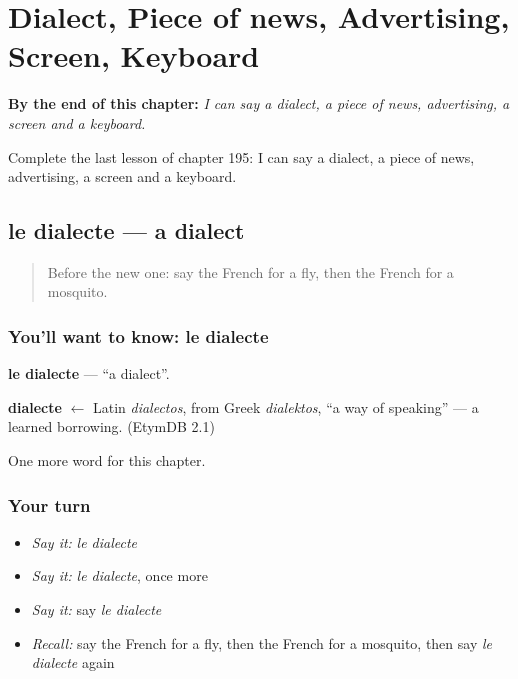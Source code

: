 
\chapter{Dialect, Piece of news, Advertising, Screen, Keyboard}
\label{ch:fr-dialect-piece-of-news-advertising-screen-keyboard}

\begin{chapteropening}
\textbf{By the end of this chapter:} \emph{I can say a dialect, a piece of news, advertising, a screen and a keyboard.}

Complete the last lesson of chapter 195: I can say a dialect, a piece of news, advertising, a screen and a keyboard.
\end{chapteropening}

\section[le dialecte]{le dialecte — a dialect}

\label{lesson:FR-C195-dialecte}



\begin{quote}
Before the new one: say the French for a fly, then the French for a mosquito.
\end{quote}

\subsection*{You'll want to know: le dialecte}
\textbf{le dialecte} — \textquotedblleft{}a dialect\textquotedblright{}.

\begin{cousinweb}
\textbf{dialecte} $\leftarrow$ Latin \emph{dialectos}, from Greek \emph{dialektos}, \textquotedblleft{}a way of speaking\textquotedblright{} — a learned borrowing. (EtymDB 2.1)
\end{cousinweb}

\begin{grammarlens}[title={What you've built}]
One more word for this chapter.
\end{grammarlens}

\subsection*{Your turn}
\begin{itemize}
\raggedright
  \item \emph{Say it:} \emph{le dialecte}
  \item \emph{Say it:} \emph{le dialecte}, once more
  \item \emph{Say it:} say \emph{le dialecte}
  \item \emph{Recall:} say the French for a fly, then the French for a mosquito, then say \emph{le dialecte} again
\end{itemize}

